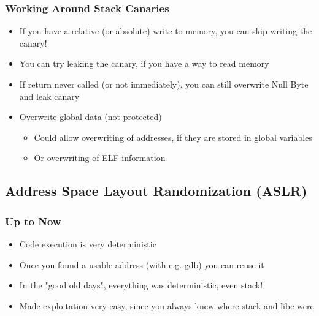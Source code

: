 \documentclass[aspectratio=169]{beamer}
\begin{document}
{\begin{frame}
    \frametitle{Working Around Stack Canaries}
    \begin{itemize}
        \item If you have a relative (or absolute) write to memory, you can skip writing the canary!
        \item You can try leaking the canary, if you have a way to read memory
        \item If return never called (or not immediately), you can still overwrite Null Byte and leak canary
        \item Overwrite global data (not protected)
        \begin{itemize}
            \item Could allow overwriting of addresses, if they are stored in global variables
            \item Or overwriting of ELF information
        \end{itemize}
    \end{itemize}
\end{frame}

\subsection{Address Space Layout Randomization (ASLR)}
\begin{frame}
    \frametitle{Up to Now}
    \begin{itemize}
        \item Code execution is very deterministic
        \item Once you found a usable address (with e.g. gdb) you can reuse it
        \item In the "good old days", everything was deterministic, even stack!
        \item Made exploitation very easy, since you always knew where stack and libc were
    \end{itemize}

\end{frame}

}
\end{document}
